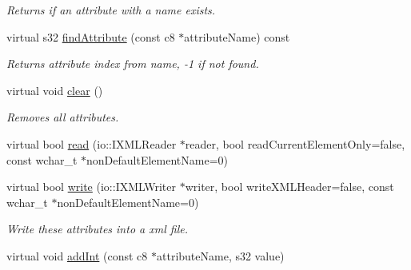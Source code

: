 \begin{DoxyCompactItemize}
\begin{DoxyCompactList}\small\item\em Returns if an attribute with a name exists. \end{DoxyCompactList}\item 
\hypertarget{classirr_1_1io_1_1_c_attributes_af2cf75e29ae88a39ecae3e948355c736}{virtual s32 \hyperlink{classirr_1_1io_1_1_c_attributes_af2cf75e29ae88a39ecae3e948355c736}{find\-Attribute} (const c8 $\ast$attribute\-Name) const }\label{classirr_1_1io_1_1_c_attributes_af2cf75e29ae88a39ecae3e948355c736}

\begin{DoxyCompactList}\small\item\em Returns attribute index from name, -\/1 if not found. \end{DoxyCompactList}\item 
\hypertarget{classirr_1_1io_1_1_c_attributes_a8b372f1251a896715478f2e81456d671}{virtual void \hyperlink{classirr_1_1io_1_1_c_attributes_a8b372f1251a896715478f2e81456d671}{clear} ()}\label{classirr_1_1io_1_1_c_attributes_a8b372f1251a896715478f2e81456d671}

\begin{DoxyCompactList}\small\item\em Removes all attributes. \end{DoxyCompactList}\item 
virtual bool \hyperlink{classirr_1_1io_1_1_c_attributes_a91a69c9156f1929a24eb7ed45e11b9b1}{read} (io\-::\-I\-X\-M\-L\-Reader $\ast$reader, bool read\-Current\-Element\-Only=false, const wchar\-\_\-t $\ast$non\-Default\-Element\-Name=0)
\item 
\hypertarget{classirr_1_1io_1_1_c_attributes_a572cc4c7746888ddaa69ce330f4660ff}{virtual bool \hyperlink{classirr_1_1io_1_1_c_attributes_a572cc4c7746888ddaa69ce330f4660ff}{write} (io\-::\-I\-X\-M\-L\-Writer $\ast$writer, bool write\-X\-M\-L\-Header=false, const wchar\-\_\-t $\ast$non\-Default\-Element\-Name=0)}\label{classirr_1_1io_1_1_c_attributes_a572cc4c7746888ddaa69ce330f4660ff}

\begin{DoxyCompactList}\small\item\em Write these attributes into a xml file. \end{DoxyCompactList}\item 
\hypertarget{classirr_1_1io_1_1_c_attributes_a5964e9a5156d42848d419052771f98fb}{virtual void \hyperlink{classirr_1_1io_1_1_c_attributes_a5964e9a5156d42848d419052771f98fb}{add\-Int} (const c8 $\ast$attribute\-Name, s32 value)}\label{classirr_1_1io_1_1_c_attributes_a5964e9a5156d42848d419052771f98fb}


\end{DoxyCompactItemize}
